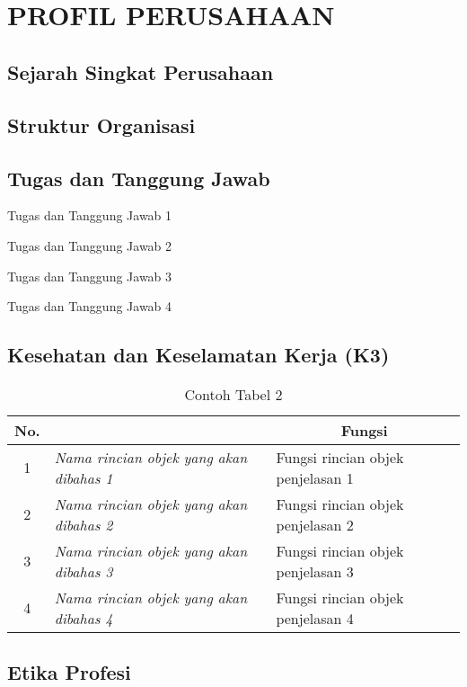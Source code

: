 \chapter[PROFIL PERUSAHAAN]{\\ PROFIL PERUSAHAAN}

\section{Sejarah Singkat Perusahaan}
\lipsum[1]

\section{Struktur Organisasi}
\lipsum[1]

\section{Tugas dan Tanggung Jawab}
\lipsum[1]

\begin{packed_enum}
    \item Tugas dan Tanggung Jawab 1
    \item Tugas dan Tanggung Jawab 2
    \item Tugas dan Tanggung Jawab 3
    \item Tugas dan Tanggung Jawab 4
\end{packed_enum}

\section{Kesehatan dan Keselamatan Kerja (K3)}
\lipsum[1]

\begin{table}[H]
    \centering
    \caption{Contoh Tabel 2}
    \label{t blok}
    \begin{tabular}{|c|l|l|}
        \hline
        \rowcolor[HTML]{C0C0C0} 
        {\color[HTML]{000000} No.} & \multicolumn{1}{c|}{\cellcolor[HTML]{C0C0C0}{\color[HTML]{000000} Nama}} & \multicolumn{1}{c|}{\cellcolor[HTML]{C0C0C0}Fungsi}  \\ \hline
        \rowcolor[HTML]{FFFFFF} 
        1 & \textit{Nama rincian objek yang akan dibahas 1} & Fungsi rincian objek penjelasan 1 \\ \hline
        2 & \textit{Nama rincian objek yang akan dibahas 2} & Fungsi rincian objek penjelasan 2 \\ \hline
        3 & \textit{Nama rincian objek yang akan dibahas 3} & Fungsi rincian objek penjelasan 3 \\ \hline
        4 & \textit{Nama rincian objek yang akan dibahas 4} & Fungsi rincian objek penjelasan 4 \\ \hline
    \end{tabular}
\end{table}

\section{Etika Profesi}
\lipsum[2]